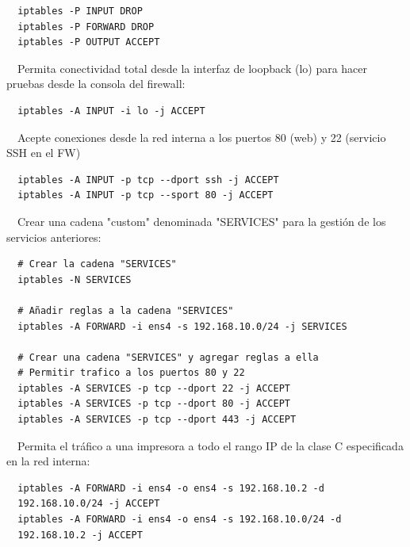 \documentclass{report}
\begin{document}
  \begin{verbatim}
  iptables -P INPUT DROP
  iptables -P FORWARD DROP
  iptables -P OUTPUT ACCEPT
  \end{verbatim}

  \CIRCLE \ \ Permita conectividad total desde la interfaz de loopback (lo) para hacer pruebas desde la consola del firewall:
  
  \begin{verbatim}
  iptables -A INPUT -i lo -j ACCEPT
  \end{verbatim}

  \CIRCLE \ \ Acepte conexiones desde la red interna a los puertos 80 (web) y 22 (servicio SSH en el FW)

  \begin{verbatim}
  iptables -A INPUT -p tcp --dport ssh -j ACCEPT
  iptables -A INPUT -p tcp --sport 80 -j ACCEPT
  \end{verbatim}

  \CIRCLE \ \ Crear una cadena "custom" denominada "SERVICES" para la gestión de los servicios anteriores:

  \begin{verbatim}
  # Crear la cadena "SERVICES"
  iptables -N SERVICES

  # Añadir reglas a la cadena "SERVICES"
  iptables -A FORWARD -i ens4 -s 192.168.10.0/24 -j SERVICES

  # Crear una cadena "SERVICES" y agregar reglas a ella
  # Permitir trafico a los puertos 80 y 22
  iptables -A SERVICES -p tcp --dport 22 -j ACCEPT
  iptables -A SERVICES -p tcp --dport 80 -j ACCEPT
  iptables -A SERVICES -p tcp --dport 443 -j ACCEPT
  \end{verbatim}

  \CIRCLE \ \ Permita el tráfico a una impresora a todo el rango IP de la clase C especificada en la red interna:

  \begin{verbatim}
  iptables -A FORWARD -i ens4 -o ens4 -s 192.168.10.2 -d
  192.168.10.0/24 -j ACCEPT
  iptables -A FORWARD -i ens4 -o ens4 -s 192.168.10.0/24 -d
  192.168.10.2 -j ACCEPT
  \end{verbatim}
\end{document}
